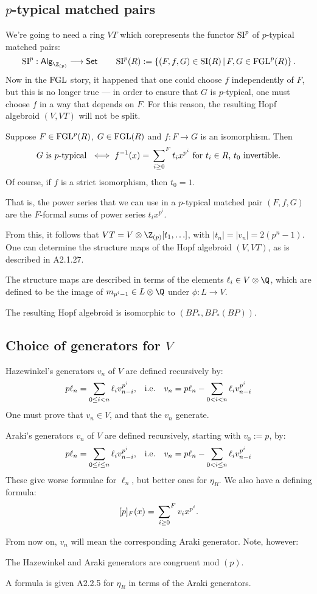 \documentclass[11pt]{article}
\newcommand\Fsum{\sideset{}{^F}\sum}
\newcommand{\FGL}{\textup{FGL}}
\newcommand{\FGLp}{\textup{FGL}^{p}}
\newcommand{\SI}{\textup{SI}}
\newcommand{\SIp}{\textup{SI}^p}
\newcommand{\ZpAlg}{\textsf{Alg}_{\Z_{(p)}}}
\begin{document}
\begin{Formal Group Laws}
\subsection*{$p$-typical matched pairs}
\begin{itemise}
\item We're going to need a ring $VT$ which corepresents the functor $\SIp$ of $p$-typical matched pairs:
\[\SIp:\ZpAlg\to\Set\qquad \SIp(R):=\left\{(F,f,G)\in\SI(R)\,\middle|\,F,G\in\FGLp(R)\right\}.\]
Now in the $\FGL$ story, it happened that one could choose $f$ independently of $F$, but this is no longer true --- in order to ensure that $G$ is $p$-typical, one must choose $f$ in a way that depends on $F$. For this reason, the resulting Hopf algebroid $(V,VT)$ will not be split.
\begin{lem*}[A2.1.26]
Suppose $F\in\FGLp(R)$, $G\in\FGL(R)$ and $f:F\to G$ is an isomorphism. Then
\[G\textup{\ is $p$-typical\ }\iff f^{-1}(x)=\Fsum_{i\geq0}t_ix^{p^i}\textup{\ for $t_i\in R$, $t_0$ invertible.}\]
Of course, if $f$ is a strict isomorphism, then $t_0=1$.
\end{lem*}
That is, the power series that we can use in a $p$-typical matched pair $(F,f,G)$ are the $F$-formal sums of power series $t_ix^{p^{i}}$.
\item From this, it follows that $VT=V\otimes\Z_{(p)}[t_1,\ldots]$, with $|t_n|=|v_n|=2(p^n-1)$. One can determine the structure maps of the Hopf algebroid $(V,VT)$, as is described in A2.1.27.

\INDENT The structure maps are described in terms of the elements $\ell_i\in V\otimes\Q$, which are defined to be the image of $m_{p^i-1}\in {L}\otimes{\Q}$ under $\phi:L\to V$.

\INDENT The resulting Hopf algebroid is isomorphic to $(BP_*,BP_*(BP))$.
\end{itemise}
\subsection*{Choice of generators for $V$}
\begin{itemise}
\item 
Hazewinkel's generators $v_n$ of $V$ are defined recursively by:
\[p\ell_n=\sum_{0\leq i<n}\ell_iv_{n-i}^{p^i}\textup{,\quad i.e.\quad }v_n=p\ell_n-\sum_{0< i<n}\ell_iv_{n-i}^{p^i}\]
One must prove that $v_n\in V$, and that the $v_n$ generate.
\item 
Araki's generators $v_n$ of $V$ are defined recursively, starting with $v_0:=p$, by:
\[p\ell_n=\sum_{0\leq i\leq n}\ell_iv_{n-i}^{p^i}\textup{,\quad i.e.\quad }v_n=p\ell_n-\sum_{0< i\leq n}\ell_iv_{n-i}^{p^i}\]
These give worse formulae for $\ell_n$, but better ones for $\eta_R$. We also have a defining formula:
\[[p]_F(x)=\Fsum_{i\geq0}v_ix^{p^i}.\]
\item From now on, $v_n$ will mean the corresponding Araki generator. Note, however:
 \begin{thm*}[A2.2.3]
The Hazewinkel and Araki generators are congruent mod $(p)$.
\end{thm*}
\item A formula is given A2.2.5 for $\eta_R$ in terms of the Araki generators.
\end{itemise}

\end{Formal Group Laws}
\end{document}
